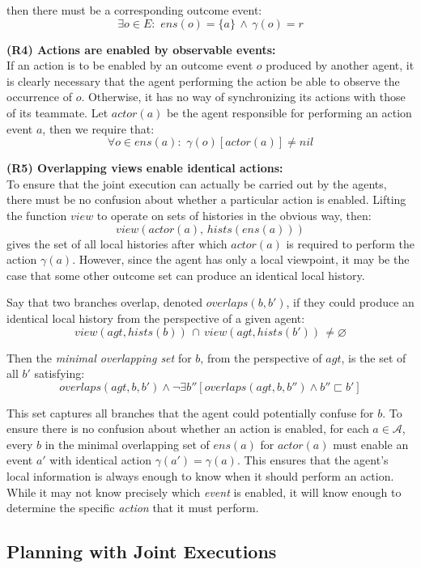 then there must be a corresponding outcome event:\[
\exists o\in E:\,\, ens(o)=\{a\}\,\wedge\,\gamma(o)=r\]


\textbf{(R4) Actions are enabled by observable events:}\\
 If an action is to be enabled by an outcome event $o$ produced by
another agent, it is clearly necessary that the agent performing the
action be able to observe the occurrence of $o$. Otherwise, it has
no way of synchronizing its actions with those of its teammate. Let
$actor(a)$ be the agent responsible for performing an action event
$a$, then we require that:\[
\forall o\in ens(a):\,\,\gamma(o)[actor(a)]\neq nil\]


\textbf{(R5) Overlapping views enable identical actions:}\\
 To ensure that the joint execution can actually be carried out by
the agents, there must be no confusion about whether a particular
action is enabled. Lifting the function $view$ to operate on sets
of histories in the obvious way, then:\[
view(actor(a),\, hists(ens(a)))\]
 gives the set of all local histories after which $actor(a)$ is required
to perform the action $\gamma(a)$. However, since the agent has only
a local viewpoint, it may be the case that some other outcome set
can produce an identical local history.

Say that two branches overlap, denoted $overlaps(b,b')$, if they
could produce an identical local history from the perspective of a
given agent:\[
view(agt,hists(b))\,\cap\, view(agt,hists(b'))\,\neq\varnothing\]


Then the \emph{minimal overlapping set} for $b$, from the perspective
of $agt$, is the set of all $b'$ satisfying:\[
overlaps(agt,b,b')\wedge\neg\exists b''\left[overlaps(agt,b,b'')\wedge b''\sqsubset b'\right]\]


This set captures all branches that the agent could potentially confuse
for $b$. To ensure there is no confusion about whether an action
is enabled, for each $a\in\mathcal{A}$, every $b$ in the minimal
overlapping set of $ens(a)$ for $actor(a)$ must enable an event
$a'$ with identical action $\gamma(a')=\gamma(a)$. This ensures
that the agent's local information is always enough to know when it
should perform an action. While it may not know precisely which \emph{event}
is enabled, it will know enough to determine the specific \emph{action}
that it must perform.


\subsection{Planning with Joint Executions}

